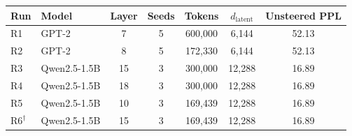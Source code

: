 \begin{tabular}{@{}l l c c c c c@{}}
\toprule
Run & Model & Layer & Seeds & Tokens & $d_{\text{latent}}$ & Unsteered PPL \\
\midrule
R1 & GPT-2 & 7 & 5 & 600{,}000 & 6{,}144 & 52.13 \\
R2 & GPT-2 & 8 & 5 & 172{,}330 & 6{,}144 & 52.13 \\
R3 & Qwen2.5-1.5B & 15 & 3 & 300{,}000 & 12{,}288 & 16.89 \\
R4 & Qwen2.5-1.5B & 18 & 3 & 300{,}000 & 12{,}288 & 16.89 \\
R5 & Qwen2.5-1.5B & 10 & 3 & 169{,}439 & 12{,}288 & 16.89 \\
R6$^{\dagger}$ & Qwen2.5-1.5B & 15 & 3 & 169{,}439 & 12{,}288 & 16.89 \\
\bottomrule
\end{tabular}